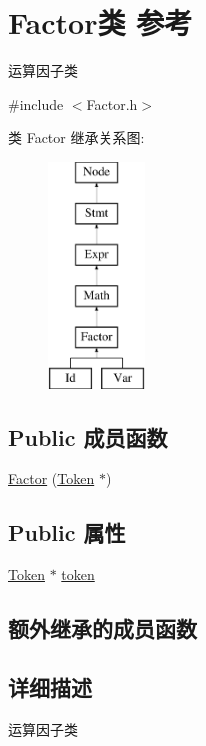 \hypertarget{class_factor}{}\section{Factor类 参考}
\label{class_factor}


运算因子类  




{\ttfamily \#include $<$Factor.\+h$>$}

类 Factor 继承关系图\+:\begin{figure}[H]
\begin{center}
\leavevmode
\includegraphics[height=6.000000cm]{class_factor}
\end{center}
\end{figure}
\subsection*{Public 成员函数}
\begin{DoxyCompactItemize}
\item 
\hyperlink{class_factor_af17f55c01064dcb353c47243931d095a}{Factor} (\hyperlink{class_token}{Token} $\ast$)
\end{DoxyCompactItemize}
\subsection*{Public 属性}
\begin{DoxyCompactItemize}
\item 
\hyperlink{class_token}{Token} $\ast$ \hyperlink{class_factor_ab2c56fe952c0e3dad6006950e166495b}{token}
\end{DoxyCompactItemize}
\subsection*{额外继承的成员函数}


\subsection{详细描述}
运算因子类 

